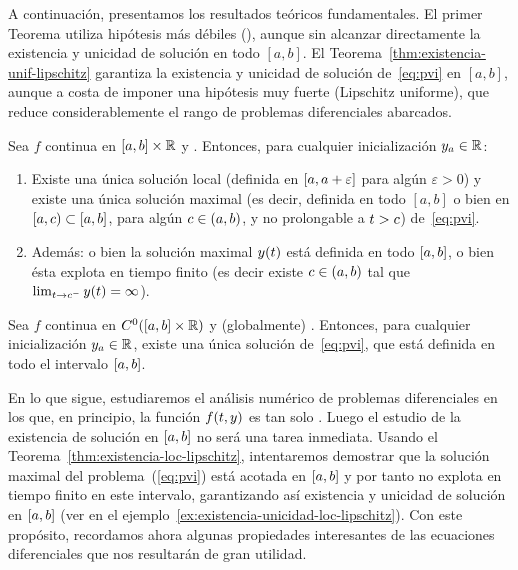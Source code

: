 A continuación, presentamos los resultados teóricos fundamentales. El
primer Teorema utiliza hipótesis más débiles (\locLipschitz), aunque
sin alcanzar directamente la existencia y unicidad de solución en todo
$[a,b]$.  El Teorema~\ref{thm:existencia-unif-lipschitz} garantiza la
existencia y unicidad de solución de~\eqref{eq:pvi} en $[a,b]$,
aunque a costa de imponer una hipótesis muy fuerte (Lipschitz
uniforme), que reduce considerablemente el rango de problemas
diferenciales abarcados.
\begin{theorem}
  \label{thm:existencia-loc-lipschitz}
  Sea $f$ continua en $[\ta,\tb]\times\Rset$ y \locLipschitz. Entonces, para
  cualquier inicialización $\ycero\in\Rset$:
  \begin{enumerate}
  \item Existe una única solución local (definida en
    $[\ta,\ta+\varepsilon]$ para algún $\varepsilon>0$) y existe una
    única solución maximal (es decir, definida en todo $[a,b]$ o bien
    en $[\ta,c)\subset[\ta,\tb]$, para algún $c\in(\ta,\tb)$, y no
    prolongable a $\tt>c$) de~\eqref{eq:pvi}.
  \item Además: o bien la solución maximal $\sol(\tt)$  está definida en todo
    $[\ta,\tb]$, o bien ésta explota en tiempo finito (es decir existe
    $c\in (\ta,\tb)$ tal que $\lim_{\tt\to c^-} \sol(\tt) = \infty$).
  \end{enumerate}
\end{theorem}

\begin{theorem}[Picard]
  \label{thm:existencia-unif-lipschitz}
  Sea $f$ continua en $C^0([\ta,\tb]\times\Rset)$ y (globalmente) \globLipschitz.
  Entonces, para cualquier inicialización $\ycero\in\Rset$, existe una
  única solución de~\eqref{eq:pvi}, que está definida en todo el
  intervalo $[\ta,\tb]$.%
\end{theorem}

En lo que sigue, estudiaremos el análisis numérico de problemas
diferenciales en los que, en principio, la función $f(\tt,y)$ es tan
solo \locLipschitz. Luego el estudio de la existencia de
solución en $[\ta,\tb]$ no será una tarea inmediata. Usando el
Teorema~\ref{thm:existencia-loc-lipschitz}, intentaremos demostrar que
la solución maximal del problema~(\ref{eq:pvi}) está acotada en
$[\ta,\tb]$ y por tanto no explota en tiempo finito en este intervalo,
garantizando así existencia y unicidad de solución en $[\ta,\tb]$ (ver
en el ejemplo~\ref{ex:existencia-unicidad-loc-lipschitz}). Con este
propósito, recordamos ahora algunas propiedades interesantes de las
ecuaciones diferenciales que nos resultarán de gran utilidad.

